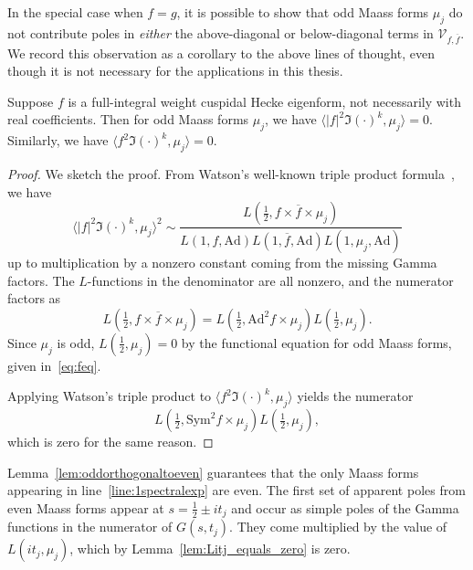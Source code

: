 In the special case when $f = g$, it is possible to show that odd Maass forms $\mu_j$ do
not contribute poles in \emph{either} the above-diagonal or below-diagonal terms in
$\mathcal{V}_{f, \overline{f}}$.
We record this observation as a corollary to the above lines of thought, even though it is
not necessary for the applications in this thesis.


\begin{corollary*}
  Suppose $f$ is a full-integral weight cuspidal Hecke eigenform, not necessarily with
  real coefficients.
  Then for odd Maass forms $\mu_j$, we have $\langle \lvert f \rvert^2 \Im(\cdot)^k, \mu_j
  \rangle = 0$.
  Similarly, we have $\langle f^2 \Im(\cdot)^k, \mu_j \rangle = 0$.
\end{corollary*}


\begin{proof}
  We sketch the proof. From Watson's well-known triple product
  formula~\cite{watson2008rankin}, we have
  \begin{equation}
    \langle \lvert f \rvert^2 \Im(\cdot)^k, \mu_j \rangle^2 \sim \frac{L(\frac{1}{2},
    f\times \overline{f} \times \mu_j)}{L(1, f, \text{Ad}) L(1, \overline{f}, \text{Ad})
    L(1, \mu_j, \text{Ad})}
  \end{equation}
  up to multiplication by a nonzero constant coming from the missing Gamma factors.
  The $L$-functions in the denominator are all nonzero, and the numerator factors as
  \begin{equation}
    L(\tfrac{1}{2}, f \times \overline{f} \times \mu_j) = L(\tfrac{1}{2}, \text{Ad}^2 f
    \times \mu_j) L(\tfrac{1}{2}, \mu_j).
  \end{equation}
  Since $\mu_j$ is odd, $L(\tfrac{1}{2}, \mu_j) = 0$ by the functional equation for odd
  Maass forms, given in~\eqref{eq:feq}.


  Applying Watson's triple product to $\langle f^2 \Im(\cdot)^k, \mu_j \rangle$ yields the
  numerator
  \begin{equation}
    L(\tfrac{1}{2}, \text{Sym}^2 f \times \mu_j) L(\tfrac{1}{2}, \mu_j),
  \end{equation}
  which is zero for the same reason.
\end{proof}



Lemma~\ref{lem:oddorthogonaltoeven} guarantees that the only Maass forms appearing in
line~\eqref{line:1spectralexp} are even. The first set of apparent poles from even Maass
forms appear at $s = \frac{1}{2} \pm it_j$ and occur as simple poles of the Gamma
functions in the numerator of $G(s, t_j)$. They come multiplied by the value of $L(it_j,
\mu_j)$, which by Lemma~\ref{lem:Litj_equals_zero} is zero.


